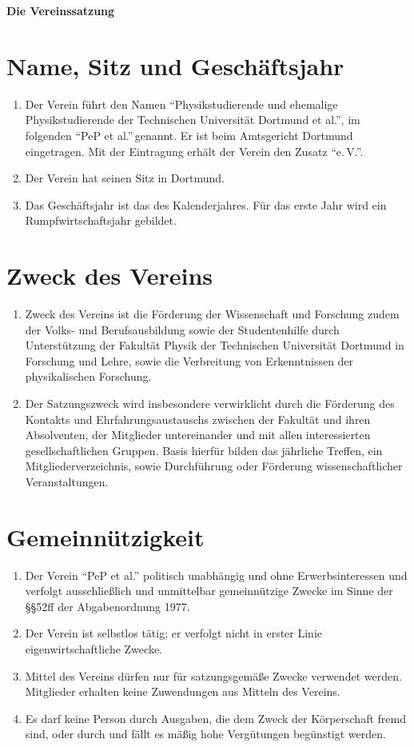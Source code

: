 \documentclass[
  fontsize=12pt,
  paper=a4,
  DIV14,
  parskip,
]{scrartcl}
\begin{document}
\textbf{\huge Die Vereinssatzung}

\section{Name, Sitz und Geschäftsjahr}

\begin{enumerate}
  \item Der Verein führt den Namen \enquote{Physikstudierende und ehemalige
    Physikstudierende der Technischen Universität Dortmund et al.}, im
    folgenden \enquote{PeP et al.}$\,$genannt. Er ist beim Amtsgericht
		Dortmund eingetragen. Mit der Eintragung erhält der Verein den Zusatz
    \enquote{e.\,V.}.
	\item Der Verein hat seinen Sitz in Dortmund.
	\item Das Geschäftsjahr ist das des Kalenderjahres. Für das erste Jahr wird
		ein Rumpfwirtschaftsjahr gebildet.
\end{enumerate}

\section{Zweck des Vereins}

\begin{enumerate}
	\item Zweck des Vereins ist die Förderung der Wissenschaft und Forschung zudem
		der Volks- und Berufsausbildung sowie der Studentenhilfe durch Unterstützung
		der Fakultät Physik der Technischen Universität Dortmund in Forschung und
		Lehre, sowie die Verbreitung von Erkenntnissen der physikalischen Forschung.
	\item Der Satzungszweck wird insbesondere verwirklicht durch die Förderung
		des Kontakts und Ehrfahrungsaustauschs zwischen der Fakultät und ihren
		Absolventen, der Mitglieder untereinander und mit allen interessierten
		gesellschaftlichen Gruppen. Basis hierfür bilden das jährliche Treffen,
		ein Mitgliederverzeichnis, sowie Durchführung oder Förderung
		wissenschaftlicher Veranstaltungen.
\end{enumerate}

\section{Gemeinnützigkeit}

\begin{enumerate}
	\item Der Verein \enquote{PeP et al.} politisch unabhängig und ohne
		Erwerbsinteressen und verfolgt ausschließlich und unmittelbar gemeinnützige
		Zwecke im Sinne der §§52ff der Abgabenordnung 1977.
	\item Der Verein ist selbstlos tätig; er verfolgt nicht in erster Linie
		eigenwirtschaftliche Zwecke.
	\item Mittel des Vereins dürfen nur für satzungsgemäße Zwecke verwendet
		werden. Mitglieder erhalten keine Zuwendungen aus Mitteln des Vereins.
	\item Es darf keine Person durch Ausgaben, die dem Zweck der Körperschaft
		fremd sind, oder durch und fällt es mäßig hohe Vergütungen begünstigt werden.
\end{enumerate}
\end{document}
